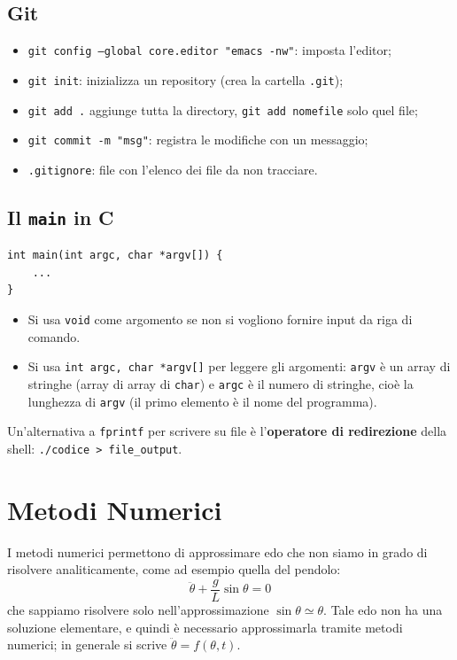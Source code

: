 \documentclass[11pt, a4paper, openright]{book}
\theoremstyle{plain}
\theoremstyle{definition}
\theoremstyle{remark}
\begin{document}
\section{Git}
\begin{itemize}
    \item \texttt{git config --global core.editor "emacs -nw"}: imposta l'editor;
    \item \texttt{git init}: inizializza un repository (crea la cartella \texttt{.git});
    \item \texttt{git add .} aggiunge tutta la directory, \texttt{git add nomefile} solo quel file;
    \item \texttt{git commit -m "msg"}: registra le modifiche con un messaggio;
    \item \texttt{.gitignore}: file con l'elenco dei file da non tracciare.
\end{itemize}

\section{Il \texttt{main} in C}
\begin{verbatim}
int main(int argc, char *argv[]) {
    ...
}
\end{verbatim}
\begin{itemize}
    \item Si usa \texttt{void} come argomento se non si vogliono fornire input da riga di comando.
    \item Si usa \texttt{int argc, char *argv[]} per leggere gli argomenti: \texttt{argv} è un array di stringhe (array di array di \texttt{char}) e \texttt{argc} è il numero di stringhe, cioè la lunghezza di \texttt{argv} (il primo elemento è il nome del programma).
\end{itemize}
Un'alternativa a \texttt{fprintf} per scrivere su file è l'\textbf{operatore di redirezione} della shell: \texttt{./codice > file\_output}.

\chapter{Metodi Numerici}
I metodi numerici permettono di approssimare edo che non siamo in grado di risolvere analiticamente, come ad esempio quella del pendolo:
\begin{equation}
    \ddot{\theta} + \frac{g}{L}\sin\theta = 0
\end{equation}
che sappiamo risolvere solo nell'approssimazione $\sin\theta \simeq \theta$. Tale edo non ha una soluzione elementare, e quindi è necessario approssimarla tramite metodi numerici; in generale si scrive $\ddot{\theta} = f(\theta, t)$.
\end{document}
